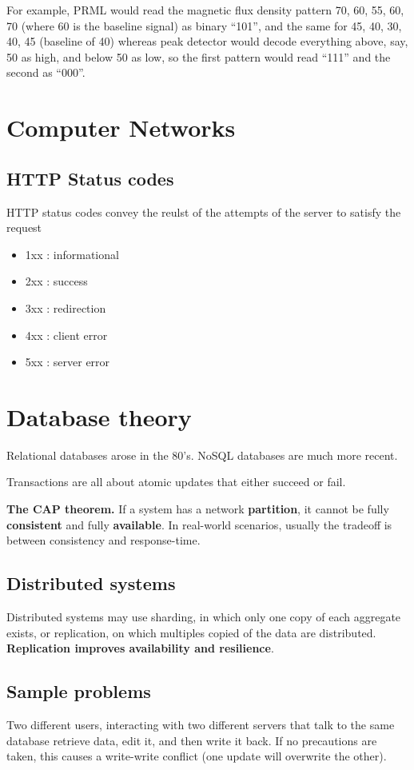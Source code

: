 \documentclass[oneside]{book}
\begin{document}
For example, PRML would read the magnetic flux density pattern 70, 60, 55, 60,
70 (where 60 is the baseline signal) as binary ``101'', and the same for 45, 40,
30, 40, 45 (baseline of 40) whereas peak detector would decode everything
above, say, 50 as high, and below 50 as low, so the first pattern would read
``111'' and the second as ``000''.

\chapter{Computer Networks}
\section{HTTP Status codes}
HTTP status codes convey the reulst of the attempts of the server to satisfy the
request
\begin{itemize}
 \item 1xx : informational
 \item 2xx : success
 \item 3xx : redirection
 \item 4xx : client error
 \item 5xx : server error
\end{itemize}

\chapter{Database theory}
Relational databases arose in the 80's. NoSQL databases are much more recent.

Transactions are all about atomic updates that either succeed or fail.

\textbf{The CAP theorem.} If a system has a network \textbf{partition}, it
cannot be fully \textbf{consistent} and fully \textbf{available}. In real-world
scenarios, usually the tradeoff is between consistency and response-time.

\section{Distributed systems}
Distributed systems may use sharding, in which only one copy of each aggregate
exists, or replication, on which multiples copied of the data are distributed.
\textbf{Replication improves availability and resilience}.

\section{Sample problems}
Two different users, interacting with two different servers that talk to the
same database retrieve data, edit it, and then write it back. If no precautions
are taken, this causes a write-write conflict (one update will overwrite the
other).
\end{document}
